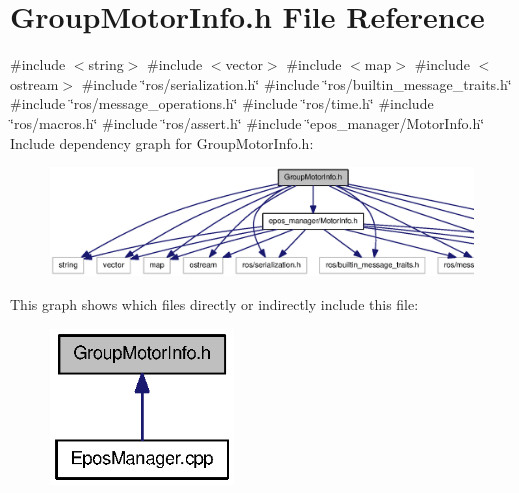 \section{\-Group\-Motor\-Info.\-h \-File \-Reference}
\label{GroupMotorInfo_8h}
{\ttfamily \#include $<$string$>$}\*
{\ttfamily \#include $<$vector$>$}\*
{\ttfamily \#include $<$map$>$}\*
{\ttfamily \#include $<$ostream$>$}\*
{\ttfamily \#include \char`\"{}ros/serialization.\-h\char`\"{}}\*
{\ttfamily \#include \char`\"{}ros/builtin\-\_\-message\-\_\-traits.\-h\char`\"{}}\*
{\ttfamily \#include \char`\"{}ros/message\-\_\-operations.\-h\char`\"{}}\*
{\ttfamily \#include \char`\"{}ros/time.\-h\char`\"{}}\*
{\ttfamily \#include \char`\"{}ros/macros.\-h\char`\"{}}\*
{\ttfamily \#include \char`\"{}ros/assert.\-h\char`\"{}}\*
{\ttfamily \#include \char`\"{}epos\-\_\-manager/\-Motor\-Info.\-h\char`\"{}}\*
\-Include dependency graph for \-Group\-Motor\-Info.\-h\-:
\nopagebreak
\begin{figure}[H]
\begin{center}
\leavevmode
\includegraphics[width=350pt]{GroupMotorInfo_8h__incl}
\end{center}
\end{figure}
\-This graph shows which files directly or indirectly include this file\-:
\nopagebreak
\begin{figure}[H]
\begin{center}
\leavevmode
\includegraphics[width=138pt]{GroupMotorInfo_8h__dep__incl}
\end{center}
\end{figure}
